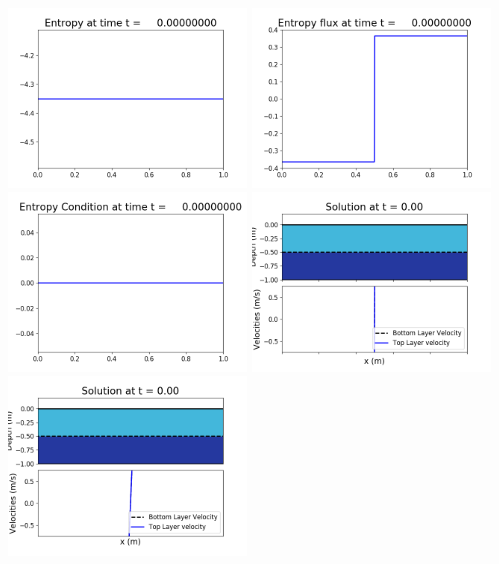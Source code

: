 \documentclass[11pt]{article}
\begin{document}
\vskip 10pt 
\includegraphics[width=0.475\textwidth]{frame0000fig1007.png}
\includegraphics[width=0.475\textwidth]{frame0000fig1008.png}
\vskip 10pt 
\includegraphics[width=0.475\textwidth]{frame0000fig1009.png}
\vskip 10pt 
\includegraphics[width=0.475\textwidth]{frame0001fig1001.png}
\includegraphics[width=0.475\textwidth]{frame0001fig1002.png}
\end{document}
